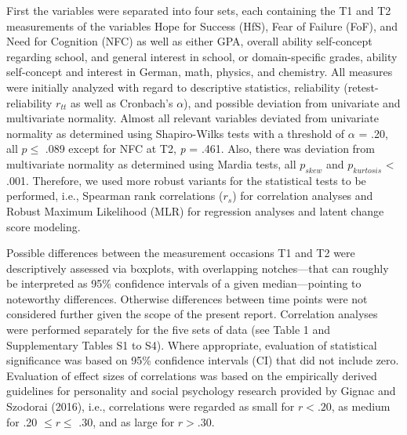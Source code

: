 \documentclass[
  man]{apa6}
\begin{document}
First the variables were separated into four sets, each containing the T1 and T2 measurements of the variables Hope for Success (HfS), Fear of Failure (FoF), and Need for Cognition (NFC) as well as either GPA, overall ability self-concept regarding school, and general interest in school, or domain-specific grades, ability self-concept and interest in German, math, physics, and chemistry. All measures were initially analyzed with regard to descriptive statistics, reliability (retest-reliability \(r_{tt}\) as well as Cronbach's \(\alpha\)), and possible deviation from univariate and multivariate normality. Almost all relevant variables deviated from univariate normality as determined using Shapiro-Wilks tests with a threshold of \(\alpha\) = .20, all \(p\le\) .089 except for NFC at T2, \emph{p} = .461. Also, there was deviation from multivariate normality as determined using Mardia tests, all \(p_{skew}\) and \(p_{kurtosis}\) \textless{} .001. Therefore, we used more robust variants for the statistical tests to be performed, i.e., Spearman rank correlations (\(r_s\)) for correlation analyses and Robust Maximum Likelihood (MLR) for regression analyses and latent change score modeling.

Possible differences between the measurement occasions T1 and T2 were descriptively assessed via boxplots, with overlapping notches---that can roughly be interpreted as 95\% confidence intervals of a given median---pointing to noteworthy differences. Otherwise differences between time points were not considered further given the scope of the present report. Correlation analyses were performed separately for the five sets of data (see Table 1 and Supplementary Tables S1 to S4). Where appropriate, evaluation of statistical significance was based on 95\% confidence intervals (CI) that did not include zero. Evaluation of effect sizes of correlations was based on the empirically derived guidelines for personality and social psychology research provided by Gignac and Szodorai (2016), i.e., correlations were regarded as small for \(r < .20\), as medium for .20 \(\le r \le\) .30, and as large for \(r > .30\).
\end{document}
